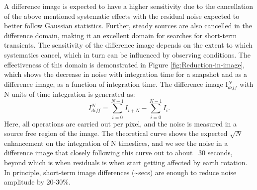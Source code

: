 \documentclass[referee]{aa}
\begin{document}
A  difference  image  is expected  to  have  a  higher  sensitivity due  to  the
cancellation of the  above mentioned systematic effects with  the residual noise
expected to better follow Gaussian statistics.  Further, steady sources are also
cancelled in the  difference domain, making it an  excellent domain for searches
for short-term transients.   The sensitivity of the difference  image depends on
the  extent to  which systematics  cancel, which  in turn  can be  influenced by
observing  conditions.  The  effectiveness  of this  domain  is demonstrated  in
Figure  \ref{fig:Reduction-in-image}, which  shows  the decrease  in noise  with
integration time  for a  snapshot and as  a difference  image, as a  function of
integration  time.  The  difference  image  I$^N_{diff}$ with  N  units of  time
integration is generated as:
\begin{equation}
I^N_{diff} = \sum\limits_{i=0}^{N-1} I_{i+N} - \sum\limits_{i=0}^{N-1} I_i. \label{eq:diff_img}
\end{equation}
Here, all operations are  carried out per pixel, and the noise  is measured in a
source  free region  of the  image.  The  theoretical curve  shows  the expected
$\sqrt{N}$ enhancement on the integration of  N timeslices, and we see the noise
in  a difference  image  that closely  following  this curve  out  to about  ~30
seconds, beyond which is when residuals  is when start getting affected by earth
rotation.     In    principle,     \mbox    {short-term}    image    differences
(\textasciitilde{}secs) are enough to reduce noise amplitude by 20-30\%.
\end{document}
